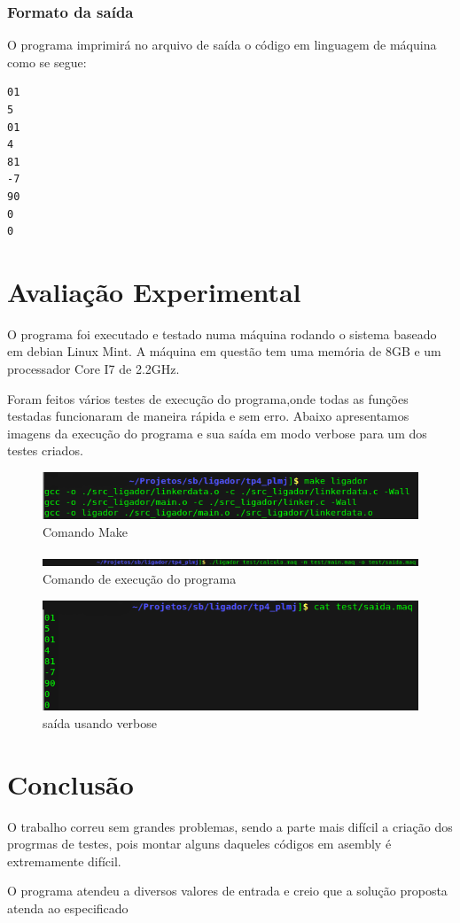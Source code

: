 \documentclass[12pt]{article}
\begin{document}
\subsubsection{Formato da saída}
O programa imprimirá no arquivo de saída o código em linguagem de máquina
como se segue:\\
\begin{footnotesize}
\begin{verbatim}
01
5
01
4
81
-7
90
0
0
\end{verbatim}
\end{footnotesize}

\newpage

\section{Avaliação Experimental}
\label{avaliacao_experimenta}
O programa foi executado e testado numa máquina rodando o sistema baseado em
debian Linux Mint. A máquina em questão tem uma memória de 8GB e um processador
Core I7 de 2.2GHz.

Foram feitos vários testes de execução do programa,onde todas as funções
testadas funcionaram de maneira rápida e sem erro. Abaixo apresentamos imagens
da execução do programa e sua saída em modo verbose para um dos testes criados.

\begin{figure}[h!]
\centering
 \includegraphics[scale=0.5]{./img/make.png}
 \caption{Comando Make}
\end{figure}

\begin{figure}[h!]
\centering
 \includegraphics[scale=0.5]{./img/exec.png}
   \caption{Comando de execução do programa}
\end{figure}

\begin{figure}[h!]
\centering
 \includegraphics[scale=0.5]{./img/teste.png}
 \caption{saída usando verbose}
\end{figure}

\section{Conclusão}
\label{conclusao}
O trabalho correu sem grandes problemas, sendo a parte mais difícil a criação
dos progrmas de testes, pois montar alguns daqueles códigos em asembly é
extremamente difícil.

O programa atendeu a diversos valores de entrada e creio que a solução proposta
atenda ao especificado
\end{document}
